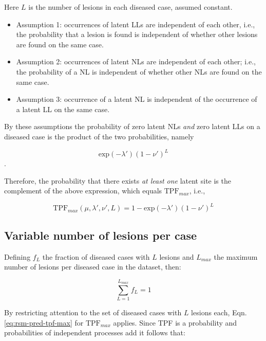 \documentclass[
]{book}
\begin{document}
Here \(L\) is the number of lesions in each diseased case, assumed constant.

\begin{itemize}
\item
  Assumption 1: occurrences of latent LLs are independent of each other, i.e., the probability that a lesion is found is independent of whether other lesions are found on the same case.
\item
  Assumption 2: occurrences of latent NLs are independent of each other; i.e., the probability of a NL is independent of whether other NLs are found on the same case.
\item
  Assumption 3: occurrence of a latent NL is independent of the occurrence of a latent LL on the same case.
\end{itemize}

By these assumptions the probability of zero latent NLs \emph{and} zero latent LLs on a diseased case is the product of the two probabilities, namely

\[\text{exp}(-\lambda') (1 - \nu')^L\].

Therefore, the probability that there exists \emph{at least one} latent site is the complement of the above expression, which equals \(\text{TPF}_{max}\), i.e.,

\begin{equation}
\text{TPF}_{max} \left ( \mu, \lambda', \nu', L \right ) = 1 - \text{exp} \left ( - \lambda' \right ) \left ( 1 - \nu' \right )^L
\label{eq:rsm-pred-tpf-max}
\end{equation}

\hypertarget{rsm-pred-end-point-variable-number-lesions}{%
\subsection{Variable number of lesions per case}\label{rsm-pred-end-point-variable-number-lesions}}

Defining \(f_L\) the fraction of diseased cases with \(L\) lesions and \(L_{max}\) the maximum number of lesions per diseased case in the dataset, then:

\begin{equation}
\sum_{L=1}^{{L_{max}}}  f_L = 1
\label{eq:rsm-pred-fl-sum}
\end{equation}

By restricting attention to the set of diseased cases with \(L\) lesions each, Eqn. \eqref{eq:rsm-pred-tpf-max} for \(\text{TPF}_{max}\) applies. Since TPF is a probability and probabilities of independent processes add it follows that:
\end{document}
